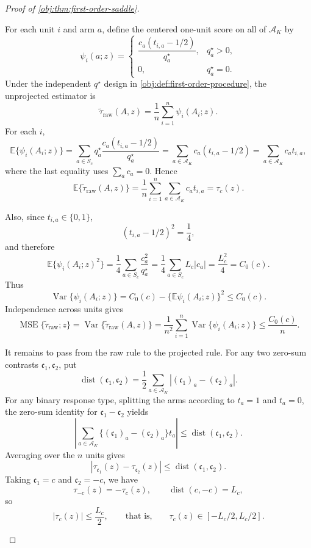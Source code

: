 \begin{proof}[Proof of \cref{obj:thm:first-order-saddle}]
\begin{enumerate}
For each unit \(i\) and arm \(a\), define the centered one-unit score on all of \(\mathcal A_K\) by
\[
\psi_i(a;z)=
\begin{cases}
\dfrac{c_a(t_{i,a}-1/2)}{q_a^\star}, & q_a^\star>0,\\[1.2ex]
0, & q_a^\star=0.
\end{cases}
\]
Under the independent \(q^\star\) design in \cref{obj:def:first-order-procedure}, the unprojected estimator is
\[
\widetilde\tau_{\mathrm{raw}}(A,z)
=
\frac1n\sum_{i=1}^n \psi_i(A_i;z).
\]
For each \(i\),
\[
\mathbb E\{\psi_i(A_i;z)\}
=
\sum_{a\in S_c} q_a^\star
\frac{c_a(t_{i,a}-1/2)}{q_a^\star}
=
\sum_{a\in\mathcal A_K} c_a(t_{i,a}-1/2)
=
\sum_{a\in\mathcal A_K} c_a t_{i,a},
\]
where the last equality uses \(\sum_a c_a=0\). Hence
\[
\mathbb E\{\widetilde\tau_{\mathrm{raw}}(A,z)\}
=
\frac1n\sum_{i=1}^n\sum_{a\in\mathcal A_K}c_at_{i,a}
=
\tau_c(z).
\]

Also, since \(t_{i,a}\in\{0,1\}\),
\[
(t_{i,a}-1/2)^2=\frac14,
\]
and therefore
\[
\mathbb E\{\psi_i(A_i;z)^2\}
=
\frac14\sum_{a\in S_c}\frac{c_a^2}{q_a^\star}
=
\frac14\sum_{a\in S_c}L_c|c_a|
=
\frac{L_c^2}{4}
=
C_0(c).
\]
Thus
\[
\operatorname{Var}\{\psi_i(A_i;z)\}
=
C_0(c)-\{\mathbb E\psi_i(A_i;z)\}^2
\le C_0(c).
\]
Independence across units gives
\[
\operatorname{MSE}\{\widetilde\tau_{\mathrm{raw}};z\}
=
\operatorname{Var}\{\widetilde\tau_{\mathrm{raw}}(A,z)\}
=
\frac1{n^2}\sum_{i=1}^n
\operatorname{Var}\{\psi_i(A_i;z)\}
\le
\frac{C_0(c)}{n}.
\]

It remains to pass from the raw rule to the projected rule. For any two zero-sum contrasts \(\mathfrak c_1,\mathfrak c_2\), put
\[
\operatorname{dist}(\mathfrak c_1,\mathfrak c_2)
=
\frac12\sum_{a\in\mathcal A_K}
|(\mathfrak c_1)_a-(\mathfrak c_2)_a|.
\]
For any binary response type, splitting the arms according to \(t_a=1\) and \(t_a=0\), the zero-sum identity for \(\mathfrak c_1-\mathfrak c_2\) yields
\[
\left|
\sum_{a\in\mathcal A_K}
\{(\mathfrak c_1)_a-(\mathfrak c_2)_a\}t_a
\right|
\le
\operatorname{dist}(\mathfrak c_1,\mathfrak c_2).
\]
Averaging over the \(n\) units gives
\[
|\tau_{\mathfrak c_1}(z)-\tau_{\mathfrak c_2}(z)|
\le
\operatorname{dist}(\mathfrak c_1,\mathfrak c_2).
\]
Taking \(\mathfrak c_1=c\) and \(\mathfrak c_2=-c\), we have
\[
\tau_{-c}(z)=-\tau_c(z),
\qquad
\operatorname{dist}(c,-c)=L_c,
\]
so
\[
|\tau_c(z)|\le \frac{L_c}{2},
\qquad\text{that is,}\qquad
\tau_c(z)\in[-L_c/2,L_c/2].
\]


\end{enumerate}
\end{proof}
